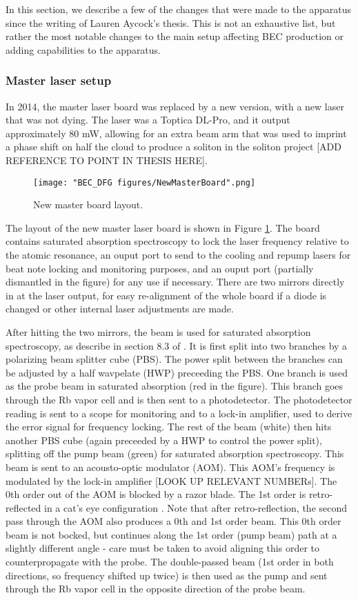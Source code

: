 In this section, we describe a few of the changes that were made to the apparatus since the writing of Lauren Aycock's thesis\cite{AycockThesis}. This is not an exhaustive list, but rather the most notable changes to the main setup affecting BEC production or adding capabilities to the apparatus. 

\subsubsection{Master laser setup}
In 2014, the master laser board was replaced by a new version, with a new laser that was not dying. The laser was a Toptica DL-Pro, and it output approximately $80$ mW, allowing for an extra beam arm that was used to imprint a phase shift on half the cloud to produce a soliton in the soliton project [ADD REFERENCE TO POINT IN THESIS HERE]\cite{Aycock2017}.
\begin{figure}
	\texttt{[image: "BEC\_DFG figures/NewMasterBoard".png]}
\caption[New master board layout]{New master board layout. }
\label{fig:NewMasterBoard}
\end{figure}

The layout of the new master laser board is shown in Figure \ref{fig:NewMasterBoard}. The board contains saturated absorption spectroscopy to lock the laser frequency relative to the atomic resonance, an ouput port to send to the cooling and repump lasers for beat note locking and monitoring purposes, and an ouput port (partially dismantled in the figure) for any use if necessary. There are two mirrors directly in at the laser output, for easy re-alignment of the whole board if a diode is changed or other internal laser adjustments are made. 

After hitting the two mirrors, the beam is used for saturated absorption spectroscopy, as describe in section 8.3 of \cite{Foot}. It is first split into two branches by a polarizing beam splitter cube (PBS). The power split between the branches can be adjusted by a half wavpelate (HWP) preceeding the PBS. One branch is used as the probe beam in saturated absorption (red in the figure). This branch goes through the Rb vapor cell and is then sent to a photodetector. The photodetector reading is sent to a scope for monitoring and to a lock-in amplifier, used to derive the error signal for frequency locking.  The rest of the beam (white) then hits another PBS cube (again preceeded by a HWP to control the power split), splitting off the pump beam (green) for saturated absorption spectroscopy. This beam is sent to an acousto-optic modulator (AOM). This AOM's frequency is modulated by the lock-in amplifier [LOOK UP RELEVANT NUMBERs]. The 0th order out of the AOM is blocked by a razor blade. The 1st order is retro-reflected in a cat's eye configuration \cite{Donley2005}. Note that after retro-reflection, the second pass through the AOM also produces a 0th and 1st order beam. This 0th order beam is not bocked, but continues along the 1st order (pump beam) path at a slightly different angle - care must be taken to avoid aligning this order to counterpropagate with the probe.   The double-passed beam (1st order in both directions, so frequency shifted up twice) is then used as the pump and sent through the Rb vapor cell in the opposite direction of the probe beam.  

